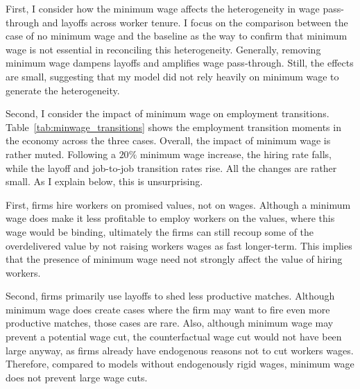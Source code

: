 First, I consider how the minimum wage affects the heterogeneity in wage pass-through and layoffs across worker tenure. I focus on the comparison between the case of no minimum wage and the baseline as the way to confirm that minimum wage is not essential in reconciling this heterogeneity. Generally, removing minimum wage dampens layoffs and amplifies wage pass-through. Still, the effects are small, suggesting that my model did not rely heavily on minimum wage to generate the heterogeneity.



Second, I consider the impact of minimum wage on employment transitions.  Table~\ref{tab:minwage_transitions} shows the employment transition moments in the economy across the three cases. Overall, the impact of minimum wage is rather muted. Following a $20\%$ minimum wage increase, the hiring rate falls, while the layoff and job-to-job transition rates rise. All the changes are rather small. As I explain below, this is unsurprising.

First, firms hire workers on promised values, not on wages. Although a minimum wage does make it less profitable to employ workers on the values, where this wage would be binding, ultimately the firms can still recoup some of the overdelivered value by not raising workers wages as fast longer-term. This implies that the presence of minimum wage need not strongly affect the value of hiring workers.

Second, firms primarily use layoffs to shed less productive matches. Although minimum wage does create cases where the firm may want to fire even more productive matches, those cases are rare. Also, although minimum wage may prevent a potential wage cut, the counterfactual wage cut would not have been large anyway, as firms already have endogenous reasons not to cut workers wages. Therefore, compared to models without endogenously rigid wages, minimum wage does not prevent large wage cuts.

